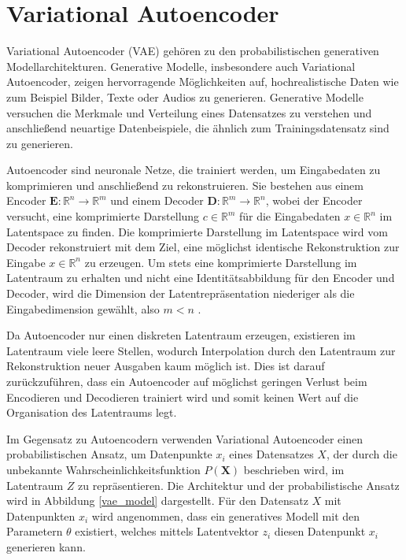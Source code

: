 \section{Variational Autoencoder}\raggedbottom
\label{vae}
Variational Autoencoder (VAE) \citep{kingma2014autoencoding} gehören zu den probabilistischen generativen Modellarchitekturen. 
Generative Modelle, insbesondere auch Variational Autoencoder, zeigen hervorragende Möglichkeiten auf, hochrealistische Daten wie zum Beispiel Bilder, Texte oder Audios zu generieren.
Generative Modelle versuchen die Merkmale und Verteilung eines Datensatzes zu verstehen und anschließend neuartige Datenbeispiele, die ähnlich zum Trainingsdatensatz sind zu generieren.

Autoencoder sind neuronale Netze, die trainiert werden, um Eingabedaten zu komprimieren und anschließend zu rekonstruieren. 
Sie bestehen aus einem Encoder $\mathbf{E}:\mathbb{R}^n \rightarrow \mathbb{R}^m$ und einem Decoder $\mathbf{D}:\mathbb{R}^m \rightarrow \mathbb{R}^n$, wobei der Encoder versucht, eine komprimierte Darstellung $c \in \mathbb{R}^{m}$ für die Eingabedaten $x \in \mathbb{R}^{n}$ im Latentspace zu finden. Die komprimierte Darstellung im Latentspace wird vom Decoder rekonstruiert mit dem Ziel, eine möglichst identische Rekonstruktion zur Eingabe $x \in \mathbb{R}^{n}$ zu erzeugen.
Um stets eine komprimierte Darstellung im Latentraum zu erhalten und nicht eine Identitätsabbildung für den Encoder und Decoder, wird die Dimension der Latentrepräsentation niederiger als die Eingabedimension gewählt, also $m<n$ \citep{introVAE}. 

Da Autoencoder nur einen diskreten Latentraum erzeugen, existieren im Latentraum viele leere Stellen, wodurch Interpolation durch den Latentraum zur Rekonstruktion neuer Ausgaben kaum möglich ist.
Dies ist darauf zurückzuführen, dass ein Autoencoder auf möglichst geringen Verlust beim Encodieren und Decodieren trainiert wird und somit keinen Wert auf die Organisation des Latentraums legt. 

Im Gegensatz zu Autoencodern verwenden Variational Autoencoder einen probabilistischen Ansatz, um Datenpunkte $x_i$ eines Datensatzes $X$, der durch die unbekannte Wahrscheinlichkeitsfunktion $P(\mathbf{X})$ beschrieben wird, im Latentraum $Z$ zu repräsentieren. 
Die Architektur und der probabilistische Ansatz wird in Abbildung \ref{vae_model} dargestellt.
Für den Datensatz $X$ mit Datenpunkten $x_i$ wird angenommen, dass ein generatives Modell mit den Parametern $\theta$ existiert, welches mittels Latentvektor $z_i$ diesen Datenpunkt $x_i$ generieren kann.

